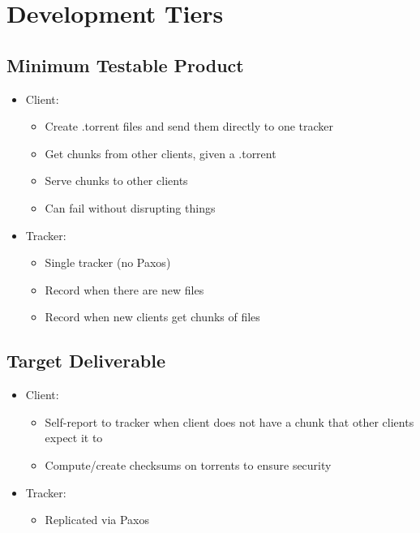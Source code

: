 \documentclass[12pt]{article}
\begin{document}
\section*{Development Tiers}

\subsection*{Minimum Testable Product}
\begin{itemize}
\item  Client:
    \begin{itemize}
    \item  Create .torrent files and send them directly to one tracker
    \item  Get chunks from other clients, given a .torrent
    \item  Serve chunks to other clients
    \item  Can fail without disrupting things
    \end{itemize}
\item  Tracker:
    \begin{itemize}
    \item  Single tracker (no Paxos)
    \item  Record when there are new files
    \item  Record when new clients get chunks of files
    \end{itemize}
\end{itemize}

\subsection*{Target Deliverable}
\begin{itemize}
\item  Client:
    \begin{itemize}
    \item  Self-report to tracker when client does not have a chunk that other
           clients expect it to
    \item  Compute/create checksums on torrents to ensure security
    \end{itemize}
\item  Tracker:
    \begin{itemize}
    \item  Replicated via Paxos
    \end{itemize}
\end{itemize}
\end{document}
